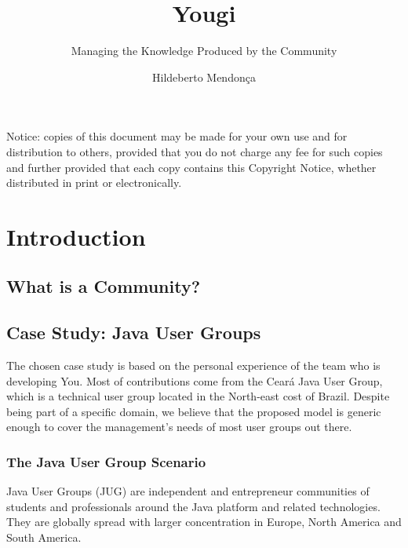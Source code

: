 \documentclass[envcountsame,envcountchap]{svmono}
\author{Hildeberto Mendon\c{c}a}
\title{Yougi}
\subtitle{Managing the Knowledge Produced by the Community}
\begin{document}
\maketitle

\frontmatter

\thispagestyle{empty}
\vspace*{3.5cm}
\begin{flushleft}
Notice: copies of this document may be made for your own use and for distribution to others, provided that you do not charge any fee for such copies and further provided that each copy contains this Copyright Notice, whether distributed in print or electronically.
\end{flushleft}

\tableofcontents

\listoffigures

\listoftables

\mainmatter

\chapter{Introduction}

\section{What is a Community?}

\section{Case Study: Java User Groups}

The chosen case study is based on the personal experience of the team who is developing You. Most of contributions come from the Cear\'{a} Java User Group, which is a technical user group located in the North-east cost of Brazil. Despite being part of a specific domain, we believe that the proposed model is generic enough to cover the management's needs of most user groups out there.

\subsection{The Java User Group Scenario}

Java User Groups (JUG) are independent and entrepreneur communities of students and professionals around the Java platform and related technologies. They are globally spread with larger concentration in Europe, North America and South America.
\end{document}
